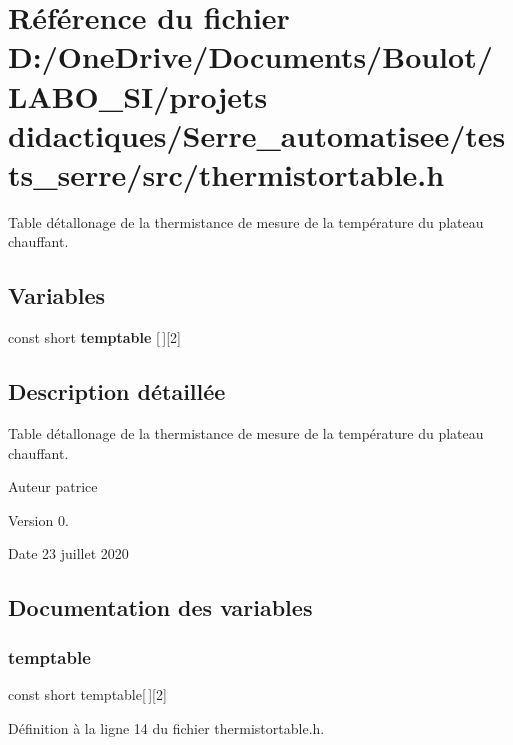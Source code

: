 \section{Référence du fichier D\+:/\+One\+Drive/\+Documents/\+Boulot/\+L\+A\+B\+O\+\_\+\+S\+I/projets didactiques/\+Serre\+\_\+automatisee/tests\+\_\+serre/src/thermistortable.h}
\label{thermistortable_8h}


Table d\textquotesingle{}étallonage de la thermistance de mesure de la température du plateau chauffant.  


\subsection*{Variables}
\begin{DoxyCompactItemize}
\item 
const short \textbf{ temptable} [$\,$][2]
\end{DoxyCompactItemize}


\subsection{Description détaillée}
Table d\textquotesingle{}étallonage de la thermistance de mesure de la température du plateau chauffant. 

\begin{DoxyAuthor}{Auteur}
patrice 
\end{DoxyAuthor}
\begin{DoxyVersion}{Version}
0. 
\end{DoxyVersion}
\begin{DoxyDate}{Date}
23 juillet 2020 
\end{DoxyDate}


\subsection{Documentation des variables}
\mbox{\label{thermistortable_8h_aebcfc4192787f9f61a3047b37d504739}} 
\subsubsection{temptable}
{\footnotesize\ttfamily const short temptable[$\,$][2]}



Définition à la ligne 14 du fichier thermistortable.\+h.

